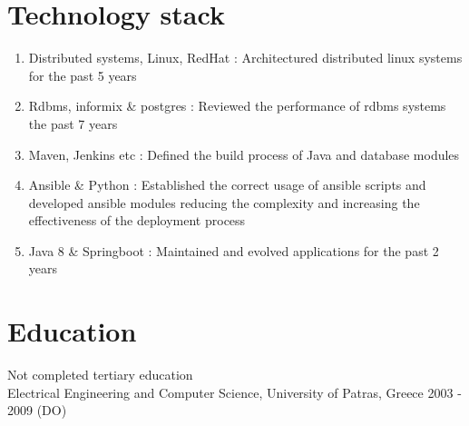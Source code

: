 \documentclass{CVSoftwareEngineer}
\begin{document}

	\section{Technology stack}
	\begin{enumerate}[labelwidth=!, labelindent=0pt, leftmargin=*]
		\item[\textasteriskcentered] Distributed systems, Linux, RedHat : Architectured distributed linux systems for the past 5 years
		\item[\textasteriskcentered] Rdbms, informix \& postgres : Reviewed the performance of rdbms systems the past 7 years
		\item[\textasteriskcentered] Maven, Jenkins etc : Defined the build process of Java and database modules
		\item[\textasteriskcentered] Ansible \& Python : Established the correct usage of ansible scripts and developed
			ansible modules reducing the complexity and increasing the
			effectiveness of the deployment process
		\item[\textasteriskcentered] Java 8 \& Springboot : Maintained and evolved applications for the past 2 years
	\end{enumerate}

	\section{Education}
	Not completed tertiary education \\
	Electrical Engineering and Computer Science, University of Patras, Greece \hfill {\scriptsize 2003 - 2009 (DO)}
\end{document}
